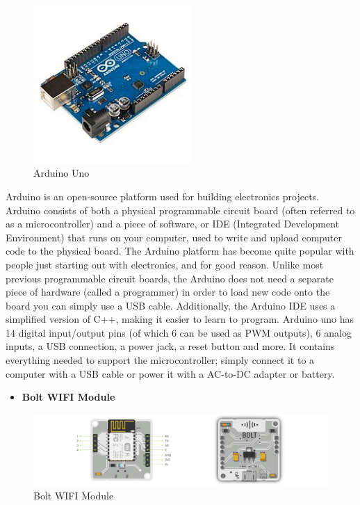 	\begin{figure}[h]
		\centering
	\includegraphics[width=60mm,scale=1]{41}
	\caption{Arduino Uno}
	\label{Arduino}
	
\end{figure}
 
 Arduino is an open-source platform used for building electronics projects. Arduino consists of both a physical programmable circuit board (often referred to as a microcontroller) and a piece of software, or IDE (Integrated Development Environment) that runs on your computer, used to write and upload computer code to the physical board. The Arduino platform has become quite popular with people just starting out with electronics, and for good reason. Unlike most previous programmable circuit boards, the Arduino does not need a separate piece of hardware (called a programmer) in order to load new code onto the board you can simply use a USB cable. Additionally, the Arduino IDE uses a simplified version of C++, making it easier to learn to program. Arduino uno has 14 digital input/output pins (of which 6 can be used as PWM outputs), 6 analog inputs, a USB connection, a power jack, a reset button and more. It contains everything needed to support the microcontroller; simply connect it to a computer with a USB cable or power it with a AC-to-DC adapter or battery.
 
\begin{itemize}
 	\item \Large\textbf {Bolt WIFI Module}
 \end{itemize}
 
	\begin{figure}[h]
		\centering
	\includegraphics[width=120mm,scale=1]{42}
	\caption{Bolt WIFI Module}
	\label{Bolt WIFI Module}
	
\end{figure}

